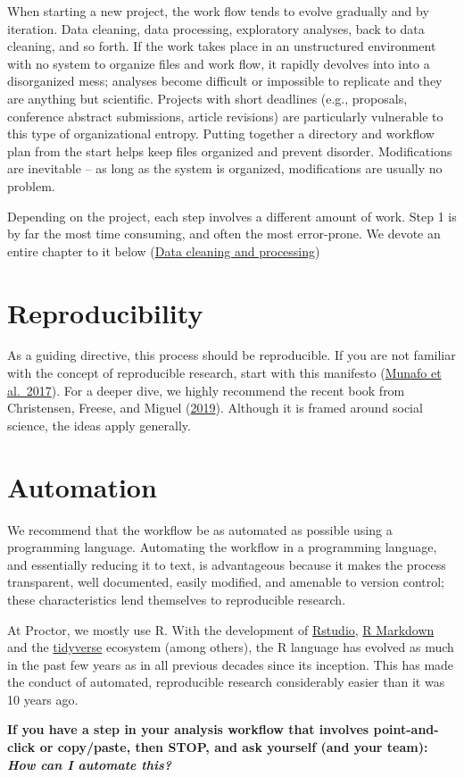 \documentclass[]{book}
\begin{document}
When starting a new project, the work flow tends to evolve gradually and by iteration. Data cleaning, data processing, exploratory analyses, back to data cleaning, and so forth. If the work takes place in an unstructured environment with no system to organize files and work flow, it rapidly devolves into into a disorganized mess; analyses become difficult or impossible to replicate and they are anything but scientific. Projects with short deadlines (e.g., proposals, conference abstract submissions, article revisions) are particularly vulnerable to this type of organizational entropy. Putting together a directory and workflow plan from the start helps keep files organized and prevent disorder. Modifications are inevitable -- as long as the system is organized, modifications are usually no problem.

Depending on the project, each step involves a different amount of work. Step 1 is by far the most time consuming, and often the most error-prone. We devote an entire chapter to it below (\protect\hyperlink{datacleaning}{Data cleaning and processing})

\hypertarget{reproducibility}{%
\section{Reproducibility}\label{reproducibility}}

As a guiding directive, this process should be reproducible. If you are not familiar with the concept of reproducible research, start with this manifesto (\href{https://www.nature.com/articles/s41562-016-0021}{Munafo et al.~2017}). For a deeper dive, we highly recommend the recent book from Christensen, Freese, and Miguel (\href{https://www.ucpress.edu/book/9780520296954/transparent-and-reproducible-social-science-research}{2019}). Although it is framed around social science, the ideas apply generally.

\hypertarget{automation}{%
\section{Automation}\label{automation}}

We recommend that the workflow be as automated as possible using a programming language. Automating the workflow in a programming language, and essentially reducing it to text, is advantageous because it makes the process transparent, well documented, easily modified, and amenable to version control; these characteristics lend themselves to reproducible research.

At Proctor, we mostly use R. With the development of \href{https://rstudio.com/}{Rstudio}, \href{https://rmarkdown.rstudio.com/}{R Markdown} and the \href{https://www.tidyverse.org/}{tidyverse} ecosystem (among others), the R language has evolved as much in the past few years as in all previous decades since its inception. This has made the conduct of automated, reproducible research considerably easier than it was 10 years ago.

\textbf{If you have a step in your analysis workflow that involves point-and-click or copy/paste, then STOP, and ask yourself (and your team): } \textbf{\emph{How can I automate this?}}


\end{document}
